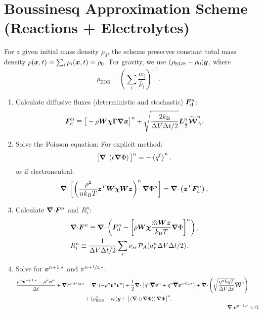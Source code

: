 \documentclass[
10pt
showpacs, showkeys,
amsmath,amssymb,
aps,
pre,
floatfix,
]{revtex4-1}
\newcommand{\divg}{{\V\nabla\cdot}}                       %
\begin{document}
\section*{Boussinesq Approximation Scheme (Reactions + Electrolytes)}

\noindent For a given initial mass density $\rho_0$, the scheme preserves constant total mass density $\rho(\boldsymbol{x},t)=\sum_i \rho_i(\boldsymbol{x},t)=\rho_0$.
For gravity, we use $(\rho_\mathrm{EOS} - \rho_0)\boldsymbol{g}$, where
\begin{equation}
\rho_\mathrm{EOS} = \left(\sum_i \frac{w_i}{\bar{\rho}_i}\right)^{-1}.
\end{equation}

\begin{enumerate}

\item Calculate diffusive fluxes (deterministic and stochastic) $\boldsymbol{F}_\mathrm{d}^n$:
\begin{equation}
\boldsymbol{F}_\mathrm{d}^n \equiv \big[-\rho\boldsymbol{W}\boldsymbol{\chi}\boldsymbol{\Gamma}\boldsymbol{\nabla}\boldsymbol{x}\big]^n + \sqrt{ \frac{2k_\mathrm{B}}{\Delta V\Delta t/2} } \boldsymbol{L}^n_{\frac12} \widetilde{\boldsymbol{\mathcal{W}}}^n_A.
\end{equation}

\item Solve the Poisson equation:
For explicit method:
\begin{equation}
\big[\divg\left(\epsilon\grad\Phi\right)\big]^n = - \left(q^\mathrm{f}\right)^n.
\end{equation}
or if electroneutral:
\begin{equation}
 \divg \left[ \left(\frac{\rho^2}{n k_B T} \V{z}^T \V{W} \V{\chi} \V{W} \V{z}\right)^n \grad \Phi^{n} \right] =
 \divg \left( \V{z}^T \V{F}_\mathrm{d}^n \right),
\end{equation}


\item Calculate $\divg\V{F}^n$ and $R^n_i$:
\begin{align}
& \divg\V{F}^n \equiv \divg \left( \V{F}_\mathrm{d}^n - \left[\rho\M{W}\V{\chi}\frac{\bar{m}\M{W}\V{z}}{k_\mathrm{B}T}\grad\Phi\right]^n \right), \\
& R^n_i \equiv \frac{1}{\D{V}\D{t}/2}\sum_r \nu_{sr}\mathcal{P}_A(a^n_r\D{V}\D{t}/2).
\end{align}

\item Solve for $\boldsymbol{v}^{n+1,*}$ and $\pi^{n+\sfrac{1}{2},*}$:
\begin{align}
\label{boussinesq_stokes_v_1st}
\begin{split}
\frac{\rho^n\V{v}^{n+1,*}-\rho^n\V{v}^n}{\D{t}} + \grad\pi^{n+\myhalf,*}
& = \divg\left(-\rho^n\V{v}^n\V{v}^n\right) + 
\frac{1}{2}\divg\left( \eta^n \overline{\grad}\V{v}^n + \eta^n \overline{\grad}\V{v}^{n+1,*} \right)
+ \divg\left( \sqrt{\frac{\eta^n k_\mathrm{B}T}{\D{V}\D{t}} } \overline{\V{\mathcal{W}}}^n \right)
\\
& + (\rho^n_\mathrm{EOS}-\rho_0)\V{g} +\big[\left(\divg(\epsilon\grad\Phi)\right)\grad\Phi\big]^n,
\end{split}
\\
\label{boussinesq_stokes_p_1st}
\divg\V{v}^{n+1,*} & = 0.
\end{align}


\end{enumerate}
\end{document}
